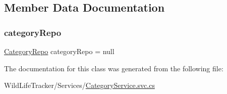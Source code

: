 \subsection{Member Data Documentation}
\mbox{\label{classWildLifeTracker_1_1CategoryService_afcd9096c0e690fe541d83bdadfe212fa}} 
\subsubsection{\texorpdfstring{category\+Repo}{categoryRepo}}
{\footnotesize\ttfamily \hyperlink{classWildLifeTracker_1_1Repository_1_1CategoryRepo}{Category\+Repo} category\+Repo = null\hspace{0.3cm}{\ttfamily [private]}}



The documentation for this class was generated from the following file\+:\begin{DoxyCompactItemize}
\item 
Wild\+Life\+Tracker/\+Services/\hyperlink{CategoryService_8svc_8cs}{Category\+Service.\+svc.\+cs}\end{DoxyCompactItemize}
